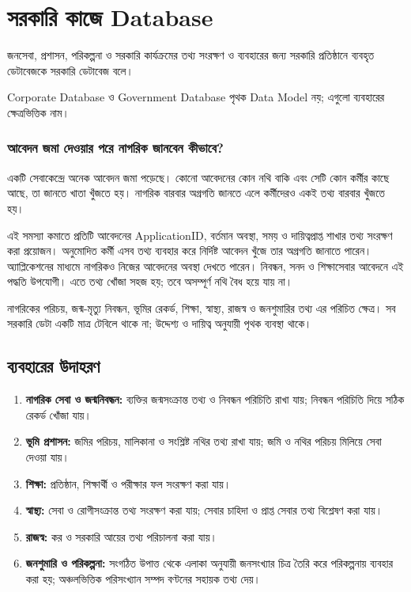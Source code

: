 \section{সরকারি কাজে Database}

\begin{definitionbox}{}
জনসেবা, প্রশাসন, পরিকল্পনা ও সরকারি কার্যক্রমের তথ্য সংরক্ষণ ও ব্যবহারের জন্য সরকারি প্রতিষ্ঠানে ব্যবহৃত ডেটাবেজকে সরকারি ডেটাবেজ বলে।
\end{definitionbox}


Corporate Database ও Government Database পৃথক Data Model নয়; এগুলো ব্যবহারের ক্ষেত্রভিত্তিক নাম।

\subsubsection{আবেদন জমা দেওয়ার পরে নাগরিক জানবেন কীভাবে?}
একটি সেবাকেন্দ্রে অনেক আবেদন জমা পড়েছে। কোনো আবেদনের কোন নথি বাকি এবং সেটি কোন কর্মীর কাছে আছে, তা জানতে খাতা খুঁজতে হয়। নাগরিক বারবার অগ্রগতি জানতে এলে কর্মীদেরও একই তথ্য বারবার খুঁজতে হয়।

এই সমস্যা কমাতে প্রতিটি আবেদনের ApplicationID, বর্তমান অবস্থা, সময় ও দায়িত্বপ্রাপ্ত শাখার তথ্য সংরক্ষণ করা প্রয়োজন। অনুমোদিত কর্মী এসব তথ্য ব্যবহার করে নির্দিষ্ট আবেদন খুঁজে তার অগ্রগতি জানাতে পারেন। অ্যাপ্লিকেশনের মাধ্যমে নাগরিকও নিজের আবেদনের অবস্থা দেখতে পারেন। নিবন্ধন, সনদ ও শিক্ষাসেবার আবেদনে এই পদ্ধতি উপযোগী। এতে তথ্য খোঁজা সহজ হয়; তবে অসম্পূর্ণ নথি বৈধ হয়ে যায় না।


নাগরিকের পরিচয়, জন্ম-মৃত্যু নিবন্ধন, ভূমির রেকর্ড, শিক্ষা, স্বাস্থ্য, রাজস্ব ও জনশুমারির তথ্য এর পরিচিত ক্ষেত্র। সব সরকারি ডেটা একটি মাত্র টেবিলে থাকে না; উদ্দেশ্য ও দায়িত্ব অনুযায়ী পৃথক ব্যবস্থা থাকে।

\subsection{ব্যবহারের উদাহরণ}
\begin{enumerate}
\item \textbf{নাগরিক সেবা ও জন্মনিবন্ধন:} ব্যক্তির জন্মসংক্রান্ত তথ্য ও নিবন্ধন পরিচিতি রাখা যায়; নিবন্ধন পরিচিতি দিয়ে সঠিক রেকর্ড খোঁজা যায়।
\item \textbf{ভূমি প্রশাসন:} জমির পরিচয়, মালিকানা ও সংশ্লিষ্ট নথির তথ্য রাখা যায়; জমি ও নথির পরিচয় মিলিয়ে সেবা দেওয়া যায়।
\item \textbf{শিক্ষা:} প্রতিষ্ঠান, শিক্ষার্থী ও পরীক্ষার ফল সংরক্ষণ করা যায়।
\item \textbf{স্বাস্থ্য:} সেবা ও রোগীসংক্রান্ত তথ্য সংরক্ষণ করা যায়; সেবার চাহিদা ও প্রাপ্ত সেবার তথ্য বিশ্লেষণ করা যায়।
\item \textbf{রাজস্ব:} কর ও সরকারি আয়ের তথ্য পরিচালনা করা যায়।
\item \textbf{জনশুমারি ও পরিকল্পনা:} সংগঠিত উপাত্ত থেকে এলাকা অনুযায়ী জনসংখ্যার চিত্র তৈরি করে পরিকল্পনায় ব্যবহার করা হয়; অঞ্চলভিত্তিক পরিসংখ্যান সম্পদ বণ্টনের সহায়ক তথ্য দেয়।
\end{enumerate}


